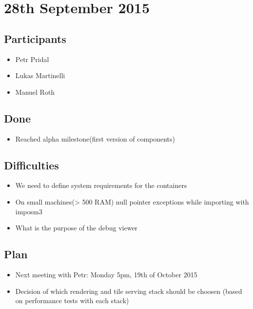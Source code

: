 \section*{28th September 2015}

\subsection*{Participants}

\begin{itemize}
  \item Petr Pridal
  \item Lukas Martinelli
  \item Manuel Roth
\end{itemize}


\subsection*{Done}

\begin{itemize}
  \item Reached alpha milestone(first version of components)
\end{itemize}

\subsection*{Difficulties}

\begin{itemize}
  \item We need to define system requirements for the containers
  \item On small machines(> 500 RAM) null pointer exceptions while importing with imposm3
  \item What is the purpose of the debug viewer
\end{itemize}

\subsection*{Plan}

\begin{itemize}
  \item Next meeting with Petr: Monday 5pm, 19th of October 2015
  \item Decision of which rendering and tile serving stack should be choosen (based on performance tests with each stack)
\end{itemize}

